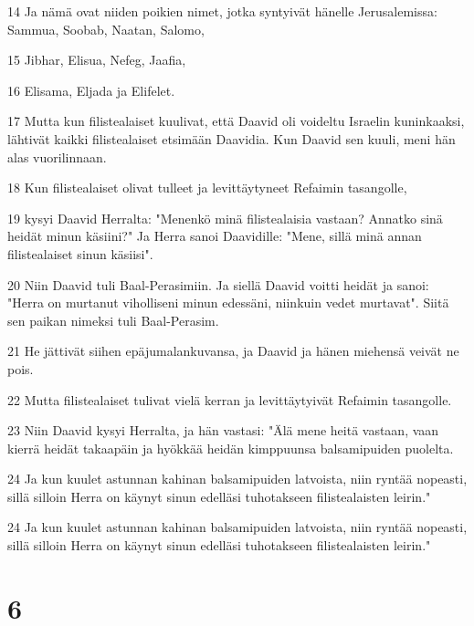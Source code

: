 \par 14 Ja nämä ovat niiden poikien nimet, jotka syntyivät hänelle Jerusalemissa: Sammua, Soobab, Naatan, Salomo,
\par 15 Jibhar, Elisua, Nefeg, Jaafia,
\par 16 Elisama, Eljada ja Elifelet.
\par 17 Mutta kun filistealaiset kuulivat, että Daavid oli voideltu Israelin kuninkaaksi, lähtivät kaikki filistealaiset etsimään Daavidia. Kun Daavid sen kuuli, meni hän alas vuorilinnaan.
\par 18 Kun filistealaiset olivat tulleet ja levittäytyneet Refaimin tasangolle,
\par 19 kysyi Daavid Herralta: "Menenkö minä filistealaisia vastaan? Annatko sinä heidät minun käsiini?" Ja Herra sanoi Daavidille: "Mene, sillä minä annan filistealaiset sinun käsiisi".
\par 20 Niin Daavid tuli Baal-Perasimiin. Ja siellä Daavid voitti heidät ja sanoi: "Herra on murtanut viholliseni minun edessäni, niinkuin vedet murtavat". Siitä sen paikan nimeksi tuli Baal-Perasim.
\par 21 He jättivät siihen epäjumalankuvansa, ja Daavid ja hänen miehensä veivät ne pois.
\par 22 Mutta filistealaiset tulivat vielä kerran ja levittäytyivät Refaimin tasangolle.
\par 23 Niin Daavid kysyi Herralta, ja hän vastasi: "Älä mene heitä vastaan, vaan kierrä heidät takaapäin ja hyökkää heidän kimppuunsa balsamipuiden puolelta.
\par 24 Ja kun kuulet astunnan kahinan balsamipuiden latvoista, niin ryntää nopeasti, sillä silloin Herra on käynyt sinun edelläsi tuhotakseen filistealaisten leirin."
\par 24 Ja kun kuulet astunnan kahinan balsamipuiden latvoista, niin ryntää nopeasti, sillä silloin Herra on käynyt sinun edelläsi tuhotakseen filistealaisten leirin."

\chapter{6}

